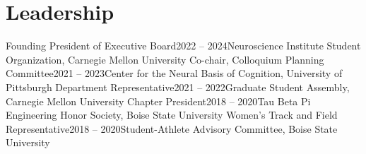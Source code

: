 \documentclass[letterpaper,10pt]{article}
\begin{document}
\section{Leadership}
  \resumeSubHeadingListStart
    \resumeSubheadingProjects
      {\small{Founding President of Executive Board}\vspace*{-0.1cm}}{2022 -- 2024}{\small{Neuroscience Institute Student Organization, Carnegie Mellon University}}{}
  \resumeSubHeadingListEnd
  \vspace*{-0.4cm}
   \resumeSubHeadingListStart
    \resumeSubheadingProjects
      {\small{Co-chair, Colloquium Planning Committee}\vspace*{-0.1cm}}{2021 -- 2023}{\small{Center for the Neural Basis of Cognition, University of Pittsburgh}}{}
  \resumeSubHeadingListEnd
  \vspace*{-0.4cm}
   \resumeSubHeadingListStart
    \resumeSubheadingProjects
      {\small{Department Representative}\vspace*{-0.1cm}}{2021 -- 2022}{\small{Graduate Student Assembly, Carnegie Mellon University}}{}
  \resumeSubHeadingListEnd
  \vspace*{-0.4cm}
   \resumeSubHeadingListStart
    \resumeSubheadingProjects
      {\small{Chapter President}\vspace*{-0.1cm}}{2018 -- 2020}{\small{Tau Beta Pi Engineering Honor Society, Boise State University}}{}
  \resumeSubHeadingListEnd
  \vspace*{-0.4cm}
   \resumeSubHeadingListStart
    \resumeSubheadingProjects
      {\small{Women's Track and Field Representative}\vspace*{-0.1cm}}{2018 -- 2020}{\small{Student-Athlete Advisory Committee, Boise State University}}{}
  \resumeSubHeadingListEnd

\end{document}
